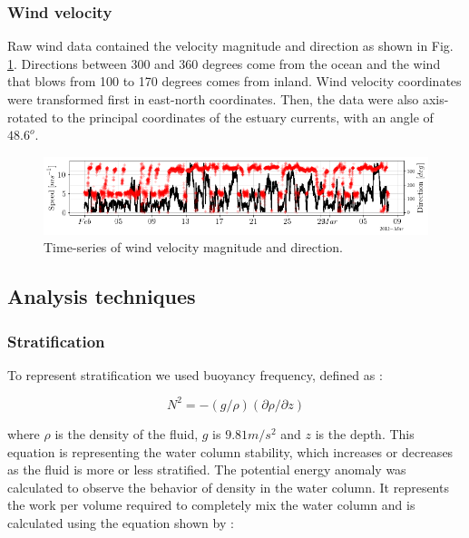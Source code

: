 \documentclass[tesis.tex]{subfiles}
\begin{document}
\subsubsection{Wind velocity}

Raw wind data contained the velocity magnitude and direction as shown in Fig. \ref{fig:wind_raw}. Directions between 300 and 360 degrees come from the ocean and the wind that blows from 100 to 170 degrees comes from inland. Wind velocity coordinates were transformed first in east-north coordinates. Then, the data were also axis-rotated to the principal coordinates of the estuary currents, with an angle of $48.6^o$.

\begin{figure}[h!]
    \centering
    \includegraphics[width=\textwidth]{Imagenes/wind_raw.png}
    \caption{Time-series of wind velocity magnitude and direction.}
    \label{fig:wind_raw}
\end{figure}

\subsection{Analysis techniques}

\subsubsection{Stratification}

To represent stratification we used buoyancy frequency, defined as \citep{kundu2002fluid}:

\begin{equation}
    N^2 = -(g/\rho)(\partial \rho/\partial z)
    \label{eq: N2}
\end{equation}

where $\rho$ is the density of the fluid, $g$ is $9.81 m/s^2$ and $z$ is the depth. This equation is representing the water column stability, which increases or decreases as the fluid is more or less stratified. The potential energy anomaly was calculated to observe the behavior of density in the water column. It represents the work per volume required to completely mix the water column and is calculated using the equation shown by \cite{simpson1990tidal}: 
\end{document}

